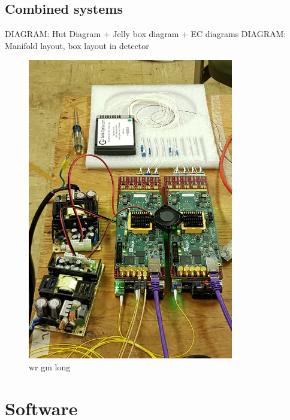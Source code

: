 \subsection{Combined systems} %
\label{sec:daq_hard_combined} %

DIAGRAM: Hut Diagram + Jelly box diagram + EC diagrams
DIAGRAM: Manifold layout, box layout in detector

\begin{figure} %
    \includegraphics[width=0.8\textwidth]{diagrams/5-daq/wr_gm.jpg}
    \caption[wr gm short]
    {wr gm long}
    \label{fig:wr_gm}
\end{figure}

\section{Software} %
\label{sec:daq_soft} %

